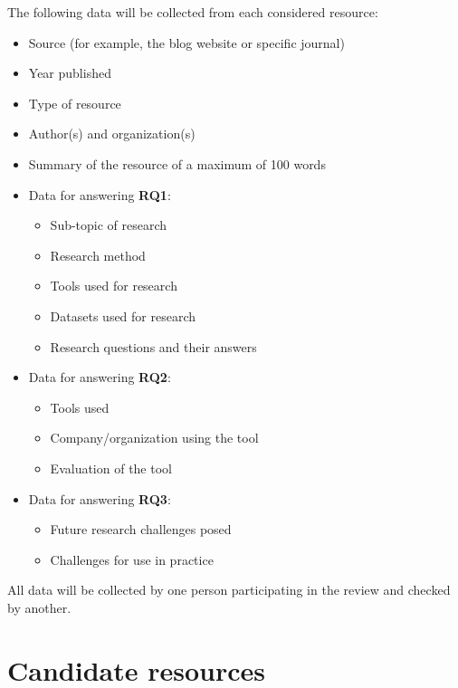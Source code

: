\documentclass[]{book}
\providecommand{\tightlist}{%
  \setlength{\itemsep}{0pt}\setlength{\parskip}{0pt}}
\begin{document}
The following data will be collected from each considered resource:

\begin{itemize}
\tightlist
\item
  Source (for example, the blog website or specific journal)
\item
  Year published
\item
  Type of resource
\item
  Author(s) and organization(s)
\item
  Summary of the resource of a maximum of 100 words
\item
  Data for answering \textbf{RQ1}:

  \begin{itemize}
  \tightlist
  \item
    Sub-topic of research
  \item
    Research method
  \item
    Tools used for research
  \item
    Datasets used for research
  \item
    Research questions and their answers
  \end{itemize}
\item
  Data for answering \textbf{RQ2}:

  \begin{itemize}
  \tightlist
  \item
    Tools used
  \item
    Company/organization using the tool
  \item
    Evaluation of the tool
  \end{itemize}
\item
  Data for answering \textbf{RQ3}:

  \begin{itemize}
  \tightlist
  \item
    Future research challenges posed
  \item
    Challenges for use in practice
  \end{itemize}
\end{itemize}

All data will be collected by one person participating in the review and
checked by another.

\section{Candidate resources}\label{candidate-resources}
\end{document}
